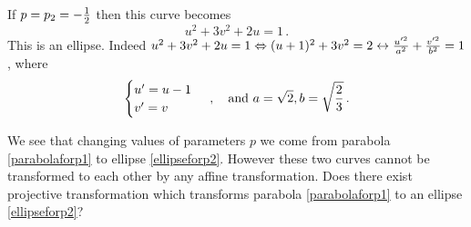 \documentclass[12pt]{article}
\numberwithin{equation}{section}
\begin{document}
 If $p=p_2=-{1\over 2}$ then this curve becomes
           \begin{equation}\label{ellipseforp2}
           u^2+3v^2+2u=1\,.   
         \end{equation}
This is an ellipse.  Indeed
$u^2+3v^2+2u=1\Leftrightarrow
    (u+1)^2+3v^2=2\leftrightarrow
   {u'^2\over a^2}+{v'^2\over b^2}=1$,
where 
           \begin{equation}\label{lastequation}
            \begin{cases}
               u'=u-1\cr 
           v'=v\cr
             \end{cases}\,,\quad
{\rm and}\,\, a=\sqrt 2, b={\sqrt{2\over 3}}\,.
            \end{equation}



We see that changing values of parameters $p$ we come 
from parabola \eqref{parabolaforp1} to
ellipse \eqref{ellipseforp2}. 
However these  two curves cannot be transformed to each other by any affine
transformation. Does there  exist projective
transformation which transforms parabola 
\eqref{parabolaforp1} to an ellipse \eqref{ellipseforp2}?
\end{document}
